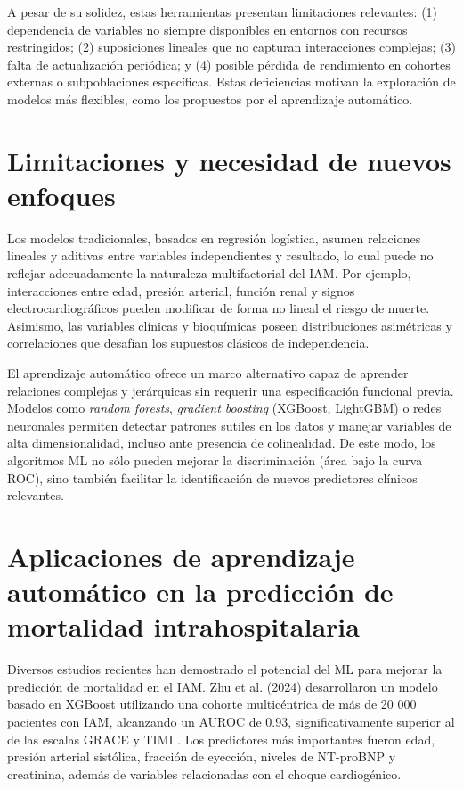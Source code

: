 \documentclass[12pt,a4paper]{article}
\begin{document}
A pesar de su solidez, estas herramientas presentan limitaciones relevantes: (1) dependencia de variables no siempre disponibles en entornos con recursos restringidos; (2) suposiciones lineales que no capturan interacciones complejas; (3) falta de actualización periódica; y (4) posible pérdida de rendimiento en cohortes externas o subpoblaciones específicas. Estas deficiencias motivan la exploración de modelos más flexibles, como los propuestos por el aprendizaje automático.

\section{Limitaciones y necesidad de nuevos enfoques}
Los modelos tradicionales, basados en regresión logística, asumen relaciones lineales y aditivas entre variables independientes y resultado, lo cual puede no reflejar adecuadamente la naturaleza multifactorial del IAM. Por ejemplo, interacciones entre edad, presión arterial, función renal y signos electrocardiográficos pueden modificar de forma no lineal el riesgo de muerte. Asimismo, las variables clínicas y bioquímicas poseen distribuciones asimétricas y correlaciones que desafían los supuestos clásicos de independencia.

El aprendizaje automático ofrece un marco alternativo capaz de aprender relaciones complejas y jerárquicas sin requerir una especificación funcional previa. Modelos como \textit{random forests}, \textit{gradient boosting} (XGBoost, LightGBM) o redes neuronales permiten detectar patrones sutiles en los datos y manejar variables de alta dimensionalidad, incluso ante presencia de colinealidad. De este modo, los algoritmos ML no sólo pueden mejorar la discriminación (área bajo la curva ROC), sino también facilitar la identificación de nuevos predictores clínicos relevantes.

\section{Aplicaciones de aprendizaje automático en la predicción de mortalidad intrahospitalaria}
Diversos estudios recientes han demostrado el potencial del ML para mejorar la predicción de mortalidad en el IAM. Zhu et al. (2024) desarrollaron un modelo basado en XGBoost utilizando una cohorte multicéntrica de más de 20 000 pacientes con IAM, alcanzando un AUROC de 0.93, significativamente superior al de las escalas GRACE y TIMI \citep{zhu2024ml}. Los predictores más importantes fueron edad, presión arterial sistólica, fracción de eyección, niveles de NT-proBNP y creatinina, además de variables relacionadas con el choque cardiogénico.
\end{document}
